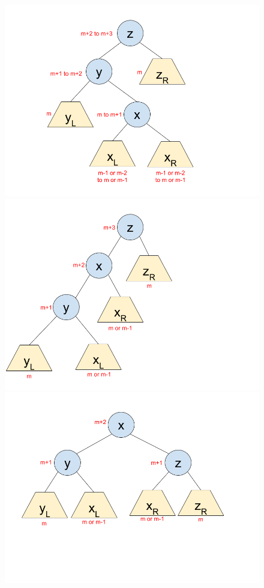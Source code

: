 \documentclass[12pt]{article}
\begin{document}
\begin{enumerate}
  \begin{figure}[h]
  \centering
    \includegraphics[trim=50 0 150 40, clip,scale=0.33]{pics/avl_insert_lr1}\\
    \includegraphics[trim=0 0 250 40, clip,scale=0.33]{pics/avl_insert_lr2}
    \includegraphics[trim=50 50 50 40, clip,scale=0.33]{pics/avl_insert_lr3}
  \end{figure}


\end{enumerate}
\end{document}
